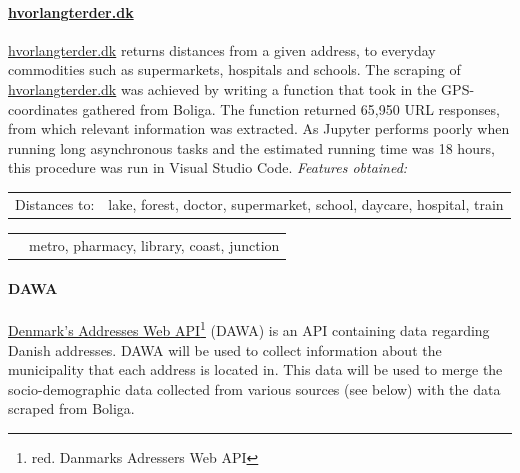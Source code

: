\documentclass[12pt,a4paper]{article}
\begin{document}
\paragraph{\href{https://www.hvorlangterder.dk}{hvorlangterder.dk}\newline}
\href{https://www.hvorlangterder.dk}{hvorlangterder.dk} returns distances from a given address, to everyday commodities such as supermarkets, hospitals and schools.   
The scraping of \href{https://www.hvorlangterder.dk}{hvorlangterder.dk} was achieved by writing a function that took in the GPS-coordinates gathered from Boliga. The function returned 65,950 URL responses, from which relevant information was extracted.\newline
As Jupyter performs poorly when running long asynchronous tasks and the estimated running time was 18 hours, this procedure was run in Visual Studio Code.
 \vspace*{10px} \newline
\textit{Features obtained:}\newline
\begin{tabular}{c c}
Distances to: & lake, forest, doctor, supermarket,	school, daycare, hospital, train \\	
\end{tabular}\newline 
\begin{tabular}{c c}
\qquad \qquad \qquad \qquad & metro, pharmacy, library, coast, junction \\	
\end{tabular}

\paragraph{DAWA\newline}
\href{https://dawa.aws.dk/}{Denmark's Addresses Web API}\footnote{red. Danmarks Adressers Web API} (DAWA) is an API containing data regarding Danish addresses. DAWA will be used to collect information about the municipality that each address is located in. This data will be used to merge the socio-demographic data collected from various sources (see below) with the data scraped from Boliga.
\end{document}
